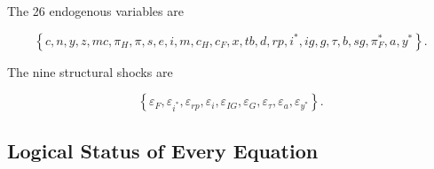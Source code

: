 The 26 endogenous variables are

\begin{equation}
\left\{
c,n,y,z,mc,\pi_H,\pi,s,e,i,m,c_H,c_F,x,tb,d,rp,
i^{*},ig,g,\tau,b,sg,\pi_F^{*},a,y^{*}
\right\}.
\end{equation}

The nine structural shocks are

\begin{equation}
\left\{
\varepsilon_F,
\varepsilon_{i^{*}},
\varepsilon_{rp},
\varepsilon_i,
\varepsilon_{IG},
\varepsilon_G,
\varepsilon_\tau,
\varepsilon_a,
\varepsilon_{y^{*}}
\right\}.
\end{equation}

\subsection{Logical Status of Every Equation}
\label{app:equation_types}


